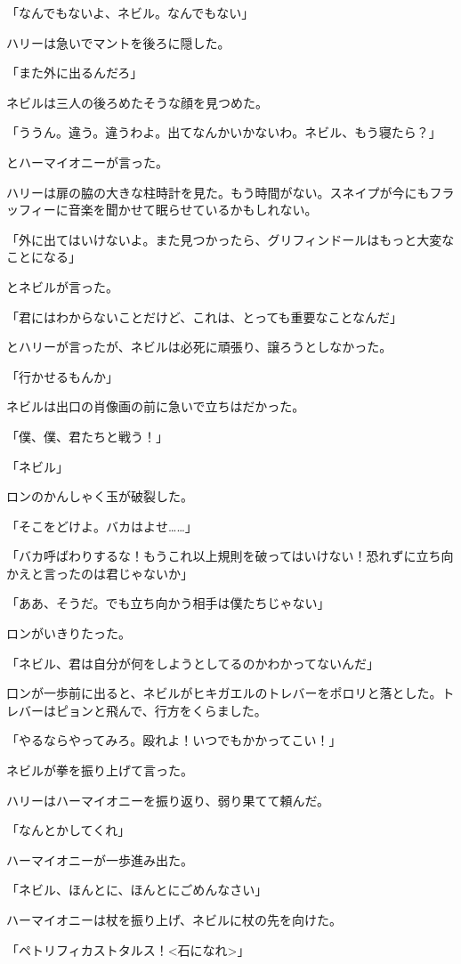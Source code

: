 \documentclass[10pt,a4paper]{article}
\begin{document}
\begin{CJK}{UTF8}{min}
「なんでもないよ、ネビル。なんでもない」

ハリーは急いでマントを後ろに隠した。

「また外に出るんだろ」

ネビルは三人の後ろめたそうな顔を見つめた。

「ううん。違う。違うわよ。出てなんかいかないわ。ネビル、もう寝たら？」

とハーマイオニーが言った。

ハリーは扉の脇の大きな柱時計を見た。もう時間がない。スネイプが今にもフラッフィーに音楽を聞かせて眠らせているかもしれない。

「外に出てはいけないよ。また見つかったら、グリフィンドールはもっと大変なことになる」

とネビルが言った。

「君にはわからないことだけど、これは、とっても重要なことなんだ」

とハリーが言ったが、ネビルは必死に頑張り、譲ろうとしなかった。

「行かせるもんか」

ネビルは出口の肖像画の前に急いで立ちはだかった。

「僕、僕、君たちと戦う！」

「ネビル」

ロンのかんしゃく玉が破裂した。

「そこをどけよ。バカはよせ……」

「バカ呼ばわりするな！もうこれ以上規則を破ってはいけない！恐れずに立ち向かえと言ったのは君じゃないか」

「ああ、そうだ。でも立ち向かう相手は僕たちじゃない」

ロンがいきりたった。

「ネビル、君は自分が何をしようとしてるのかわかってないんだ」

口ンが一歩前に出ると、ネビルがヒキガエルのトレバーをポロリと落とした。トレバーはピョンと飛んで、行方をくらました。

「やるならやってみろ。殴れよ！いつでもかかってこい！」

ネビルが拳を振り上げて言った。

ハリーはハーマイオニーを振り返り、弱り果てて頼んだ。

「なんとかしてくれ」

ハーマイオニーが一歩進み出た。

「ネビル、ほんとに、ほんとにごめんなさい」

ハーマイオニーは杖を振り上げ、ネビルに杖の先を向けた。

「ペトリフィカストタルス！<石になれ>」


\end{CJK}
\end{document}
